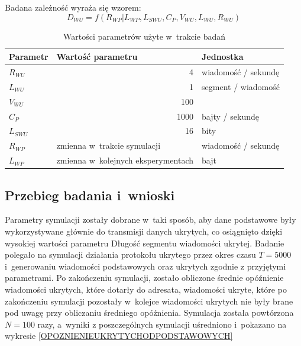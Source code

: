 \documentclass[a4paper, twoside, 12pt]{report}
\begin{document}
            Badana zależność wyraża się wzorem: \\
                $$ D_{WU} = f(R_{WP} | L_{WP}, L_{SWU}, C_P, V_{WU}, L_{WU}, R_{WU}) $$
            \begin{table}[h]
                \centering
                \begin{tabular}{ | l | r | l | }
                    \hline
                    {\bfseries Parametr} & \multicolumn{1}{|l|}{{\bfseries Wartość parametru}} & {\bfseries Jednostka} \\ \hline
                    \( R_{WU} \) & 4 & wiadomość / sekundę \\ \hline
                    \( L_{WU} \) & 1 & segment / wiadomość \\ \hline
                    \( V_{WU} \) & 100 & \\ \hline
                    \( C_P \) & 1000 & bajty / sekundę \\ \hline
                    \( L_{SWU} \) & 16 & bity \\ \hline
                    \( R_{WP} \) & \multicolumn{1}{|l|}{zmienna w~trakcie symulacji} & wiadomość / sekundę \\ \hline
                    \( L_{WP} \) & zmienna w~kolejnych eksperymentach & bajt \\ \hline
                \end{tabular}
                \caption{Wartości parametrów użyte w~trakcie badań}
            \end{table}
        \subsection{Przebieg badania i~wnioski}
            Parametry symulacji zostały dobrane w~taki sposób, aby dane podstawowe
            były wykorzystywane głównie do transmisji danych ukrytych, co osiągnięto
            dzięki wysokiej wartości parametru Długość segmentu wiadomości ukrytej.
            Badanie polegało na symulacji działania protokołu ukrytego przez okres czasu
            \( T = 5000 \) i~generowaniu wiadomości podstawowych oraz ukrytych zgodnie
            z przyjętymi parametrami. Po zakończeniu symulacji, zostało obliczone
            średnie opóźnienie wiadomości ukrytych, które dotarły do adresata, wiadomości
            ukryte, które po zakończeniu symulacji pozostały w~kolejce wiadomości
            ukrytych nie były brane pod uwagę przy obliczaniu średniego opóźnienia.
            Symulacja została powtórzona \( N = 100 \) razy, a~wyniki z poszczególnych
            symulacji uśredniono i~pokazano na wykresie \ref{OPOZNIENIEUKRYTYCHODPODSTAWOWYCH}
\end{document}

